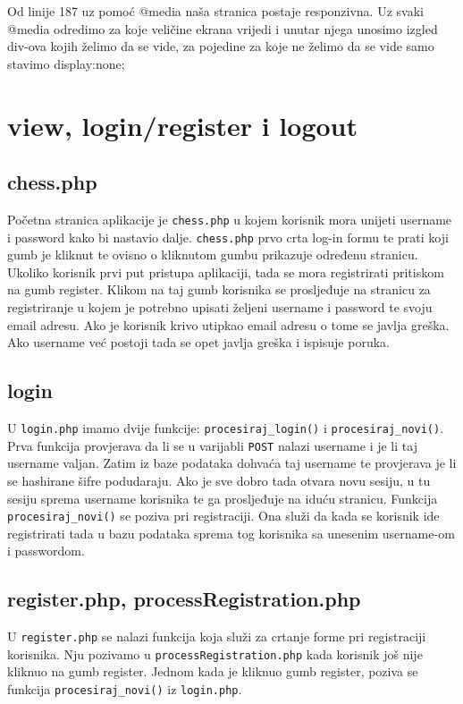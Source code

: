 \documentclass{article}
\begin{document}
Od linije 187 uz pomoć @media naša stranica postaje responzivna.
Uz svaki @media odredimo za koje veličine ekrana vrijedi i unutar njega unosimo izgled div-ova kojih želimo da se vide, za pojedine za koje ne želimo da se vide samo stavimo display:none;

\section{view, login/register i logout}

\subsection{chess.php}
Početna stranica aplikacije je \verb|chess.php| u kojem korisnik mora unijeti username i password kako bi nastavio dalje. \verb|chess.php| prvo crta log-in formu te prati koji gumb je kliknut te ovisno o kliknutom gumbu prikazuje određenu stranicu. Ukoliko korisnik prvi put pristupa aplikaciji, tada se mora registrirati pritiskom na gumb register. Klikom na taj gumb korisnika se prosljeđuje na stranicu za registriranje u kojem je potrebno upisati željeni username i password te svoju email adresu. Ako je korisnik krivo utipkao email adresu o tome se javlja greška. Ako username već postoji tada se opet javlja greška i ispisuje poruka.

\subsection{login}

U \verb|login.php| imamo dvije funkcije: \verb|procesiraj_login()| i \verb|procesiraj_novi()|. Prva funkcija provjerava da li se u varijabli \verb|POST| nalazi username i je li taj username valjan. Zatim iz baze podataka dohvaća taj username te provjerava je li se hashirane šifre podudaraju. Ako je sve dobro tada otvara novu sesiju, u tu sesiju sprema username korisnika te ga prosljeđuje na iduću stranicu. Funkcija \verb|procesiraj_novi()| se poziva pri registraciji. Ona služi da kada se korisnik ide registrirati tada u bazu podataka sprema tog korisnika sa unesenim username-om i passwordom.

\subsection{register.php, processRegistration.php}

U \verb|register.php| se nalazi funkcija koja služi za crtanje forme pri registraciji korisnika. Nju pozivamo u \verb|processRegistration.php| kada korisnik još nije kliknuo na gumb register. Jednom kada je kliknuo gumb register, poziva se funkcija \verb|procesiraj_novi()| iz \verb|login.php|.
\end{document}

